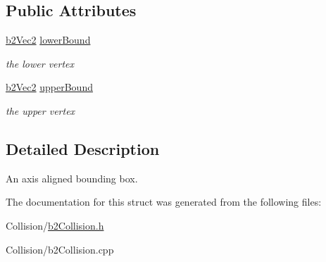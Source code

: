 \subsection*{Public Attributes}
\begin{DoxyCompactItemize}
\item 
\mbox{\label{structb2AABB_ab94b68fbad8348b22b0522469b11bdb5}} 
\mbox{\hyperlink{structb2Vec2}{b2\+Vec2}} \mbox{\hyperlink{structb2AABB_ab94b68fbad8348b22b0522469b11bdb5}{lower\+Bound}}
\begin{DoxyCompactList}\small\item\em the lower vertex \end{DoxyCompactList}\item 
\mbox{\label{structb2AABB_ad4a8ec483ba13a2c02918b01d058a18f}} 
\mbox{\hyperlink{structb2Vec2}{b2\+Vec2}} \mbox{\hyperlink{structb2AABB_ad4a8ec483ba13a2c02918b01d058a18f}{upper\+Bound}}
\begin{DoxyCompactList}\small\item\em the upper vertex \end{DoxyCompactList}\end{DoxyCompactItemize}


\subsection{Detailed Description}
An axis aligned bounding box. 

The documentation for this struct was generated from the following files\+:\begin{DoxyCompactItemize}
\item 
Collision/\mbox{\hyperlink{b2Collision_8h}{b2\+Collision.\+h}}\item 
Collision/b2\+Collision.\+cpp\end{DoxyCompactItemize}
